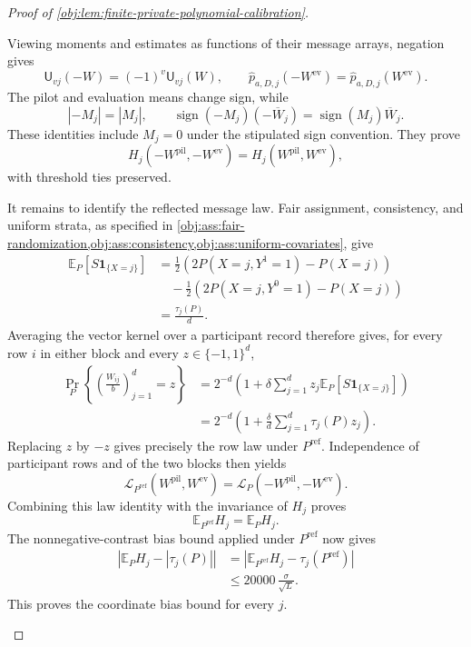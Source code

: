 \documentclass[11pt]{article}
\begin{document}
\begin{proof}[Proof of \cref{obj:lem:finite-private-polynomial-calibration}]
\begin{enumerate}
Viewing moments and estimates as functions of their message arrays, negation gives
\[
\mathsf U_{vj}(-W)=(-1)^v\mathsf U_{vj}(W),
\qquad
\widehat p_{a,D,j}(-W^{\mathrm{ev}})
=\widehat p_{a,D,j}(W^{\mathrm{ev}}).
\]
The pilot and evaluation means change sign, while
\[
|-M_j|=|M_j|,
\qquad
\operatorname{sign}(-M_j)(-\overline W_j)
=\operatorname{sign}(M_j)\overline W_j.
\]
These identities include \(M_j=0\) under the stipulated sign convention. They prove
\[
H_j(-W^{\mathrm{pil}},-W^{\mathrm{ev}})
=H_j(W^{\mathrm{pil}},W^{\mathrm{ev}}),
\]
with threshold ties preserved.

It remains to identify the reflected message law. Fair assignment, consistency, and uniform strata, as specified in
\cref{obj:ass:fair-randomization,obj:ass:consistency,obj:ass:uniform-covariates}, give
\[
\begin{aligned}
\mathbb E_P[S\mathbf1_{\{X=j\}}]
&=\frac12\left(2P(X=j,Y^1=1)-P(X=j)\right)\\
&\quad-\frac12\left(2P(X=j,Y^0=1)-P(X=j)\right)\\
&=\frac{\tau_j(P)}d.
\end{aligned}
\]
Averaging the vector kernel over a participant record therefore gives, for every row \(i\) in either block and every \(z\in\{-1,1\}^d\),
\[
\begin{aligned}
\Pr_P\!\left\{\left(\frac{W_{ij}}b\right)_{j=1}^d=z\right\}
&=2^{-d}\left(1+\delta\sum_{j=1}^d
 z_j\mathbb E_P[S\mathbf1_{\{X=j\}}]\right)\\
&=2^{-d}\left(1+\frac\delta d\sum_{j=1}^d\tau_j(P)z_j\right).
\end{aligned}
\]
Replacing \(z\) by \(-z\) gives precisely the row law under \(P^{\mathrm{ref}}\). Independence of participant rows and of the two blocks then yields
\[
\mathcal L_{P^{\mathrm{ref}}}(W^{\mathrm{pil}},W^{\mathrm{ev}})
=\mathcal L_P(-W^{\mathrm{pil}},-W^{\mathrm{ev}}).
\]
Combining this law identity with the invariance of \(H_j\) proves
\[
\mathbb E_{P^{\mathrm{ref}}}H_j=\mathbb E_PH_j.
\]
The nonnegative-contrast bias bound applied under \(P^{\mathrm{ref}}\) now gives
\[
\begin{aligned}
\left|\mathbb E_PH_j-|\tau_j(P)|\right|
&=\left|\mathbb E_{P^{\mathrm{ref}}}H_j
       -\tau_j(P^{\mathrm{ref}})\right|\\
&\le20000\,\frac{\sigma}{\sqrt L}.
\end{aligned}
\]
This proves the coordinate bias bound for every \(j\).


\end{enumerate}
\end{proof}
\end{document}
